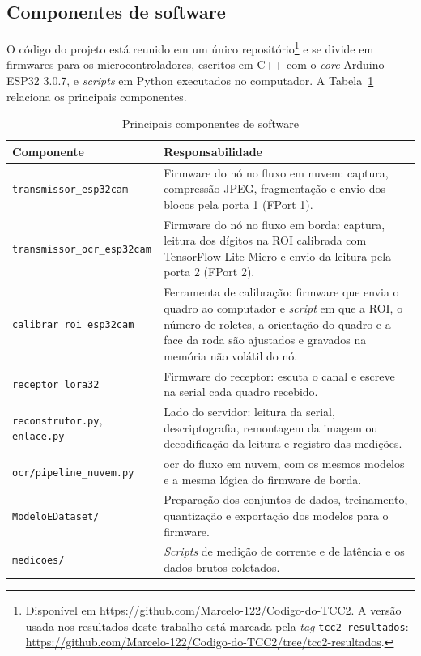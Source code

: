 \subsection{Componentes de software}
\label{subsec:software}

O código do projeto está reunido em um único repositório\footnote{Disponível em
\url{https://github.com/Marcelo-122/Codigo-do-TCC2}. A versão usada nos resultados deste
trabalho está marcada pela \textit{tag} \texttt{tcc2-resultados}:
\url{https://github.com/Marcelo-122/Codigo-do-TCC2/tree/tcc2-resultados}.} e se divide em firmwares para os
microcontroladores, escritos em C++ com o \textit{core} Arduino-ESP32 3.0.7, e
\textit{scripts} em Python executados no computador. A Tabela~\ref{tab:software} relaciona
os principais componentes.

\begin{table}[H]
    \centering
    \caption{Principais componentes de software}
    \label{tab:software}
    \begin{tabularx}{\textwidth}{@{}lX@{}}
        \toprule
        \textbf{Componente} & \textbf{Responsabilidade} \\
        \midrule
        \texttt{transmissor\_esp32cam} & Firmware do nó no fluxo em nuvem: captura, compressão JPEG,
        fragmentação e envio dos blocos pela porta 1 (FPort 1). \\
        \texttt{transmissor\_ocr\_esp32cam} & Firmware do nó no fluxo em borda: captura, leitura
        dos dígitos na ROI calibrada com TensorFlow Lite Micro e envio da leitura pela porta 2 (FPort 2). \\
        \texttt{calibrar\_roi\_esp32cam} & Ferramenta de calibração: firmware que envia o quadro ao
        computador e \textit{script} em que a ROI, o número de roletes, a orientação do quadro e a
        face da roda são ajustados e gravados na memória não volátil do nó. \\
        \texttt{receptor\_lora32} & Firmware do receptor: escuta o canal e escreve na serial cada
        quadro recebido. \\
        \texttt{reconstrutor.py}, \texttt{enlace.py} & Lado do servidor: leitura da serial,
        descriptografia, remontagem da imagem ou decodificação da leitura e registro das medições. \\
        \texttt{ocr/pipeline\_nuvem.py} & \gls{ocr} do fluxo em nuvem, com os mesmos modelos e a
        mesma lógica do firmware de borda. \\
        \texttt{ModeloEDataset/} & Preparação dos conjuntos de dados, treinamento, quantização e
        exportação dos modelos para o firmware. \\
        \texttt{medicoes/} & \textit{Scripts} de medição de corrente e de latência e os dados
        brutos coletados. \\
        \bottomrule
    \end{tabularx}
\end{table}

